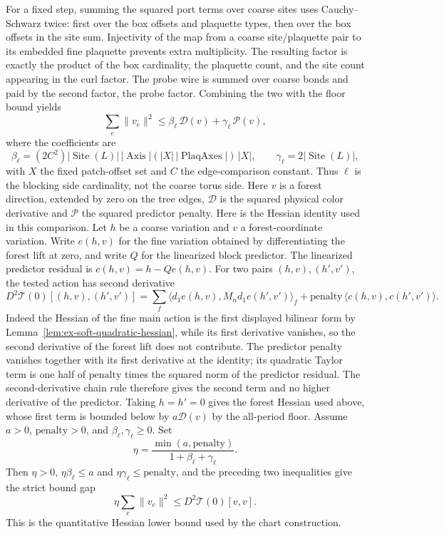For a fixed step, summing the squared port terms over coarse sites uses
Cauchy--Schwarz twice: first over the box offsets and plaquette types,
then over the box offsets in the site sum. Injectivity of the map from a
coarse site/plaquette pair to its embedded fine plaquette prevents extra
multiplicity. The resulting factor is exactly the product of the box
cardinality, the plaquette count, and the site count appearing in the
curl factor. The probe wire is summed over coarse bonds and paid
by the second factor, the probe factor. Combining the two with the floor
bound yields
\[
 \sum_e\|v_e\|^2\leq \beta_\ell\,\mathcal D(v)
                      +\gamma_\ell\,\mathcal P(v),
\]
where the coefficients are
\[
 \beta_\ell=(2C^2)|\operatorname{Site}(L)|\,|\operatorname{Axis}|
       (|X|\,|\operatorname{PlaqAxes}|)\,|X|,
 \qquad
 \gamma_\ell=2|\operatorname{Site}(L)|,
\]
with $X$ the fixed patch-offset set and $C$ the edge-comparison constant.
Thus $\ell$ is the blocking side cardinality, not the coarse torus side.
Here $v$ is a forest direction, extended by zero on the tree edges,
$\mathcal D$ is the squared physical color derivative and
$\mathcal P$ the squared predictor penalty. Here is the Hessian identity used in this comparison. Let $h$ be a
coarse variation and $v$ a forest-coordinate variation. Write
$e(h,v)$ for the fine variation obtained by differentiating the forest
lift at zero, and write $Q$ for the linearized block predictor. The
linearized predictor residual is
$c(h,v)=h-Qe(h,v)$. For two pairs $(h,v),(h',v')$, the tested action
has second derivative
\[
 D^2\mathcal T(0)[(h,v),(h',v')]
 =\sum_f\langle d_1e(h,v),M_nd_1e(h',v')\rangle_f
   +\mathrm{penalty}\,\langle c(h,v),c(h',v')\rangle.
\]
Indeed the Hessian of the fine main action is the first displayed
bilinear form by Lemma~\ref{lem:ex-soft-quadratic-hessian}, while its first
derivative vanishes, so the second derivative of the forest lift does
not contribute. The predictor penalty vanishes together with its first
derivative at the identity; its quadratic Taylor term is one half of
$\mathrm{penalty}$ times the squared norm of the predictor residual.
The second-derivative chain rule therefore gives the second term and no
higher derivative of the predictor. Taking $h=h'=0$ gives the forest
Hessian used above, whose first term is bounded below by
$a\mathcal D(v)$ by the all-period floor. Assume $a>0$, $\mathrm{penalty}>0$, and
$\beta_\ell,\gamma_\ell\geq0$. Set
\[
 \eta=\frac{\min(a,\mathrm{penalty})}{1+\beta_\ell+\gamma_\ell}.
\]
Then $\eta>0$, $\eta\beta_\ell\leq a$ and
$\eta\gamma_\ell\leq\mathrm{penalty}$, and the preceding two inequalities
give the strict bound gap
\[
 \eta\sum_e\|v_e\|^2\leq
 D^2\mathcal T(0)[v,v].
\]
This is the quantitative Hessian lower bound used by the chart construction.


